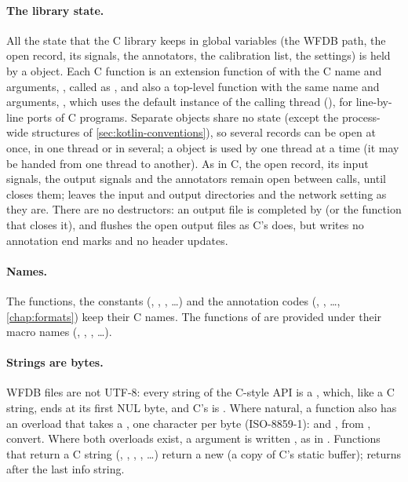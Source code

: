 \paragraph{The library state.} All the state that the C library keeps in global variables
(the WFDB path, the open record, its signals, the annotators, the calibration list, the
settings) is held by a  object. Each C function is an extension function of
 with the C name and arguments, , called as , and also a top-level function with the same name
and arguments, , which uses the default instance of the calling thread
(), for line-by-line ports of C programs. Separate  objects
share no state (except the process-wide structures of \cref{sec:kotlin-conventions}), so
several records can be open at once, in one thread or in several; a
 object is used by one thread at a time (it may be handed from one thread to
another). As in C, the open record, its input signals, the output signals and the
annotators remain open between calls, until  closes them;
 leaves the input and output directories and the network setting as they
are. There are no destructors: an output file is completed by  (or the
function that closes it), and  flushes the open output files as C's
 does, but writes no annotation end marks and no header updates.

\paragraph{Names.} The functions, the constants (,
, , \ldots) and the annotation codes
(, , \ldots, \cref{chap:formats}) keep their C names. The functions
of  are provided under their macro names (,
, , \ldots).

\paragraph{Strings are bytes.} WFDB files are not UTF-8: every string of the C-style API
is a , which, like a C string, ends at its first NUL byte, and C's
 is . Where natural, a function also has an overload that takes a
, one character per byte (ISO-8859-1):  and
, from , convert. Where both overloads exist, a
 argument is written , as in
. Functions that return a C string (,
, , , \ldots) return a new  (a
copy of C's static buffer);  returns  after the last info
string.

